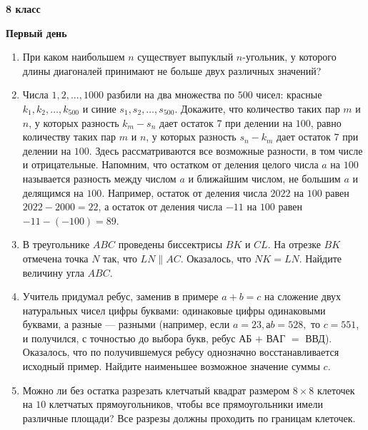 \documentclass{article}
\begin{document}
\large
	
\begin{center}
	\LARGE\textbf{8 класс}
\end{center}
\begin{center}
	\large\textbf{Первый день}
\end{center}


\begin{enumerate}[label*=8.{\arabic{enumi}}]
	
\item При каком наибольшем $n$ существует выпуклый $n$-угольник, у которого длины диагоналей принимают не больше двух различных значений?

\item Числа $1, 2, ..., 1000$ разбили на два множества по $500$ чисел: красные $k_1, k_2, \dotsc, k_{500}$ и синие $s_1, s_2, \dotsc, s_{500}$. Докажите, что количество таких пар $m$ и $n$, у которых разность $k_m-s_n$ дает остаток $7$ при делении на $100$, равно количеству таких пар $m$ и $n$, у которых разность $s_n-k_m$ дает остаток $7$ при делении на $100$. Здесь рассматриваются все возможные разности, в том числе и отрицательные.
Напомним, что остатком от деления целого числа $a$ на $100$ называется разность между числом $a$ и ближайшим числом, не большим $a$ и делящимся на $100$. Например, остаток от деления числа $2022$ на $100$ равен $2022-2000 = 22$, а остаток от деления числа $-11$ на $100$ равен $-11-(-100) = 89$.

\item В треугольнике $ABC$ проведены биссектрисы $BK$ и $CL$. На отрезке $BK$ отмечена точка $N$ так, что $LN \parallel AC$. Оказалось, что $NK = LN$. Найдите величину угла $ABC$.

\item Учитель придумал ребус, заменив в примере $a+b = c$ на сложение двух натуральных чисел цифры буквами: одинаковые цифры одинаковыми буквами, а разные — разными
(например, если $a = 23, а b = 528,$ то $c = 551$, и получился, с точностью до выбора букв, ребус АБ $+$ ВАГ $=$ ВВД). 
Оказалось, что по получившемуся ребусу однозначно восстанавливается исходный пример. Найдите наименьшее возможное значение суммы $c$.
	
\item Можно ли без остатка разрезать клетчатый квадрат размером $8\times 8$ клеточек на $10$ клетчатых прямоугольников, чтобы все прямоугольники имели различные площади? Все разрезы должны проходить по границам клеточек.

\end{enumerate}
\end{document}
